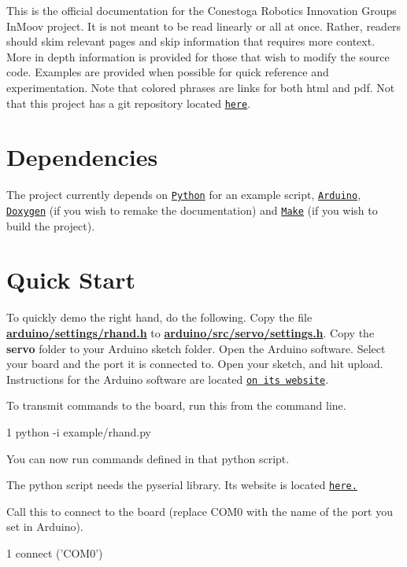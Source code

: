 This is the official documentation for the Conestoga Robotics Innovation Group\textquotesingle{}s In\+Moov project. It is not meant to be read linearly or all at once. Rather, readers should skim relevant pages and skip information that requires more context. More in depth information is provided for those that wish to modify the source code. Examples are provided when possible for quick reference and experimentation. Note that colored phrases are links for both html and pdf. Not that this project has a git repository located \href{https://github.com/rbong/rig-inmoov}{\tt here}.\hypertarget{index_Dependencies}{}\section{Dependencies}\label{index_Dependencies}
The project currently depends on \href{http://www.python.org}{\tt Python} for an example script, \href{http://www.arduino.cc}{\tt Arduino}, \href{http://www.stack.nl/~dimitri/doxygen/}{\tt Doxygen} (if you wish to remake the documentation) and \href{http://www.gnu.org/software/make/}{\tt Make} (if you wish to build the project).\hypertarget{index_Quick_Start}{}\section{Quick Start}\label{index_Quick_Start}
To quickly demo the right hand, do the following. Copy the file {\bfseries \hyperlink{rhand_8h}{arduino/settings/rhand.\+h}} to {\bfseries \hyperlink{settings_8h}{arduino/src/servo/settings.\+h}}. Copy the {\bfseries servo} folder to your Arduino sketch folder. Open the Arduino software. Select your board and the port it is connected to. Open your sketch, and hit upload. Instructions for the Arduino software are located \href{http://www.arduino.cc}{\tt on its website}.

To transmit commands to the board, run this from the command line. 
\begin{DoxyCode}
1 python -i example/rhand.py
\end{DoxyCode}
 You can now run commands defined in that python script.

The python script needs the pyserial library. Its website is located \href{http://pyserial.sourceforge.net/}{\tt here.}

Call this to connect to the board (replace C\+O\+M0 with the name of the port you set in Arduino). 
\begin{DoxyCode}
1 connect (\textcolor{stringliteral}{'COM0'})
\end{DoxyCode}


